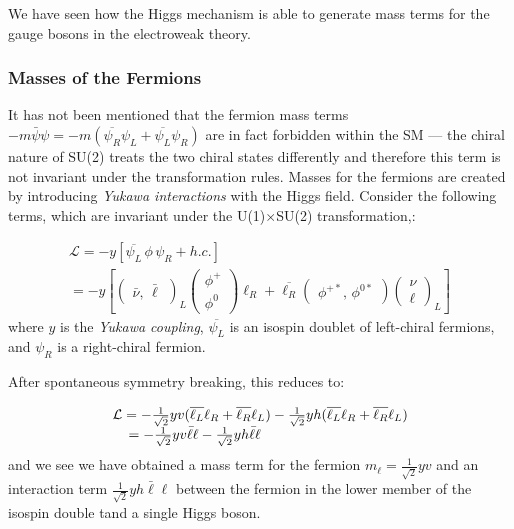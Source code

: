 We have seen how the Higgs mechanism is able to generate mass terms for the gauge bosons in the electroweak theory.

\subsubsection{Masses of the Fermions}

It has not been mentioned that the fermion mass terms $-m\bar{\psi}\psi = -m( \overline{\psi_{R}} \psi_{L} + \overline{\psi_{L}}\psi_{R})$ are in fact forbidden within the SM --- the chiral nature of SU(2) treats the two chiral states differently and therefore this term is not invariant under the transformation rules. Masses for the fermions are created by introducing \textit{Yukawa interactions} with the Higgs field. Consider the following terms, which are invariant under the U(1)$\times$SU(2) transformation,:

\begin{equation}
\begin{array}{l}
\mathcal{L} = -y [ \overline{\psi_{L}} \, \phi \, \psi_{R} + h.c.]\\
=  -y\left[\begin{pmatrix} \bar{\nu},\,\bar{\ell}\end{pmatrix}_{L} \begin{pmatrix} \phi^{+} \\ \phi^{0} \end{pmatrix} \ell_{R} + 
\overline{\ell_{R}} \begin{pmatrix} \phi^{+*},\,\phi^{0*} \end{pmatrix} \begin{pmatrix} \nu \\ \ell \end{pmatrix}_{L}\right]
\end{array}
\end{equation}
where $y$ is the \textit{Yukawa coupling}, $\overline{\psi_{L}}$ is an isospin doublet of left-chiral fermions, and $\psi_{R}$ is a right-chiral fermion.

After spontaneous symmetry breaking, this reduces to:

\begin{equation}
\begin{array}{l}
\mathcal{L} =
-\frac{1}{\sqrt{2}}yv (\overline{\ell_{L}}\ell_{R} + \overline{\ell_{R}}\ell_{L})
-\frac{1}{\sqrt{2}}yh (\overline{\ell_{L}}\ell_{R} + \overline{\ell_{R}}\ell_{L})\\
\hspace{4mm} = - \frac{1}{\sqrt{2}} yv \bar{\ell}\ell - \frac{1}{\sqrt{2}} y h \bar{\ell}\ell
\end{array}
\end{equation}
and we see we have obtained a mass term for the fermion $m_{\ell} = \frac{1}{\sqrt{2}} yv$ and an interaction term $\frac{1}{\sqrt{2}} y h \bar{\ell}\ell$ between the fermion in the lower member of the isospin double tand a single Higgs boson.

